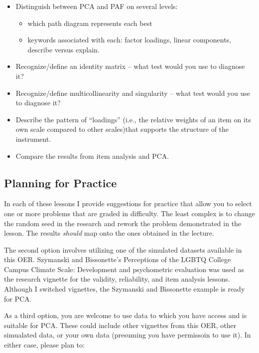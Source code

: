 \documentclass[
  english,
]{book}
\providecommand{\tightlist}{%
  \setlength{\itemsep}{0pt}\setlength{\parskip}{0pt}}
\begin{document}
\begin{itemize}
\tightlist
\item
  Distinguish between PCA and PAF on several levels:

  \begin{itemize}
  \tightlist
  \item
    which path diagram represents each best
  \item
    keywords associated with each: factor loadings, linear components, describe versus explain.
  \end{itemize}
\item
  Recognize/define an identity matrix -- what test would you use to diagnose it?
\item
  Recognize/define multicollinearity and singularity -- what test would you use to diagnose it?
\item
  Describe the pattern of ``loadings'' (i.e., the relative weights of an item on its own scale compared to other scales)that supports the structure of the instrument.
\item
  Compare the results from item analysis and PCA.
\end{itemize}

\hypertarget{planning-for-practice-6}{%
\subsection{Planning for Practice}\label{planning-for-practice-6}}

In each of these lessons I provide suggestions for practice that allow you to select one or more problems that are graded in difficulty. The least complex is to change the random seed in the research and rework the problem demonstrated in the lesson. The results \emph{should} map onto the ones obtained in the lecture.

The second option involves utilizing one of the simulated datasets available in this OER. Szymanski and Bissonette's \citeyearpar{szymanski_perceptions_2020}Perceptions of the LGBTQ College Campus Climate Scale: Development and psychometric evaluation was used as the research vignette for the validity, reliability, and item analysis lessons. Although I switched vignettes, the Szymanski and Bissonette example is ready for PCA.

As a third option, you are welcome to use data to which you have access and is suitable for PCA. These could include other vignettes from this OER, other simualated data, or your own data (presuming you have permissoin to use it). In either case, please plan to:
\end{document}
